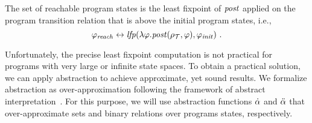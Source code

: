 The set of reachable program states is the least fixpoint of $\mathit{post}$
applied on the program transition relation that is above the initial
program states, i.e.,
%
\begin{equation*}
  \varphi_\mathit{reach} \leftrightarrow \mathit{lfp}(\lambda
  \varphi.\mathit{post}(
  \rho_{\mathcal{T}}, \varphi),
  \varphi_{\mathit{init}})\ .
\end{equation*}
%

Unfortunately, the precise least fixpoint computation is not practical
for programs with very large or infinite state spaces.
To obtain a practical solution, we can apply abstraction to achieve
approximate, yet sound results.
We formalize abstraction as over-approximation following the framework
of abstract interpretation~\cite{lattice77,CousotAPCT84}.
For this purpose, we will use abstraction functions $\dot{\alpha}$ and
$\ddot{\alpha}$ that over-approximate sets and binary relations over
programs states, respectively.

\fi


